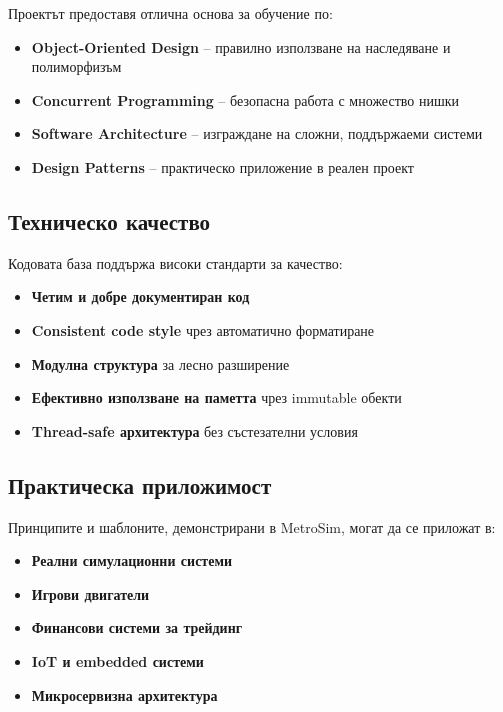 \documentclass{article}
\begin{document}
Проектът предоставя отлична основа за обучение по:

\begin{itemize}
	\item \textbf{Object-Oriented Design} – правилно използване на наследяване и полиморфизъм
	\item \textbf{Concurrent Programming} – безопасна работа с множество нишки
	\item \textbf{Software Architecture} – изграждане на сложни, поддържаеми системи
	\item \textbf{Design Patterns} – практическо приложение в реален проект
\end{itemize}

\subsection{Техническо качество}

Кодовата база поддържа високи стандарти за качество:

\begin{itemize}
	\item \textbf{Четим и добре документиран код}
	\item \textbf{Consistent code style} чрез автоматично форматиране
	\item \textbf{Модулна структура} за лесно разширение
	\item \textbf{Ефективно използване на паметта} чрез immutable обекти
	\item \textbf{Thread-safe архитектура} без състезателни условия
\end{itemize}

\subsection{Практическа приложимост}

Принципите и шаблоните, демонстрирани в MetroSim, могат да се приложат в:

\begin{itemize}
	\item \textbf{Реални симулационни системи}
	\item \textbf{Игрови двигатели}
	\item \textbf{Финансови системи за трейдинг}
	\item \textbf{IoT и embedded системи}
	\item \textbf{Микросервизна архитектура}
\end{itemize}
\end{document}
